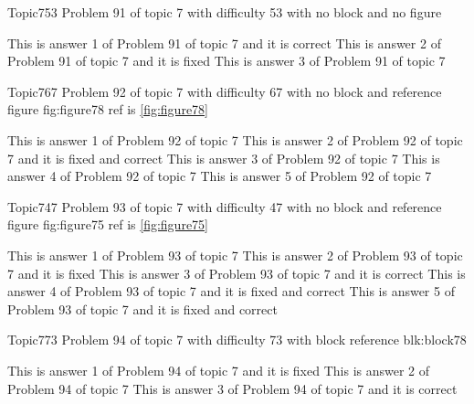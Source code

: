 \documentclass[master]{exam}
\begin{document}
\begin{problem}{Topic7}{53}
	Problem 91 of topic 7 with difficulty 53 with no block and no figure
	\begin{answers}
		\answer[correct] This is answer 1 of Problem 91 of topic 7 and it is correct
		\answer[fixed] This is answer 2 of Problem 91 of topic 7 and it is fixed
		\answer This is answer 3 of Problem 91 of topic 7 
	\end{answers}
\end{problem}

\begin{problem}{Topic7}{67}
	Problem 92 of topic 7 with difficulty 67 with no block and reference figure fig:figure78 ref is \ref{fig:figure78}
	\begin{answers}
		\answer This is answer 1 of Problem 92 of topic 7 
		 This is answer 2 of Problem 92 of topic 7 and it is fixed and correct
		\answer This is answer 3 of Problem 92 of topic 7 
		\answer This is answer 4 of Problem 92 of topic 7 
		\answer This is answer 5 of Problem 92 of topic 7 
	\end{answers}
\end{problem}

\begin{problem}{Topic7}{47}
	Problem 93 of topic 7 with difficulty 47 with no block and reference figure fig:figure75 ref is \ref{fig:figure75}
	\begin{answers}
		\answer This is answer 1 of Problem 93 of topic 7 
		\answer[fixed] This is answer 2 of Problem 93 of topic 7 and it is fixed
		\answer[correct] This is answer 3 of Problem 93 of topic 7 and it is correct
		 This is answer 4 of Problem 93 of topic 7 and it is fixed and correct
		 This is answer 5 of Problem 93 of topic 7 and it is fixed and correct
	\end{answers}
\end{problem}

\begin{problem}[requires=blk:block78]{Topic7}{73}
	Problem 94 of topic 7 with difficulty 73 with block reference blk:block78
	\begin{answers}
		\answer[fixed] This is answer 1 of Problem 94 of topic 7 and it is fixed
		\answer This is answer 2 of Problem 94 of topic 7 
		\answer[correct] This is answer 3 of Problem 94 of topic 7 and it is correct
	\end{answers}
\end{problem}
\end{document}
